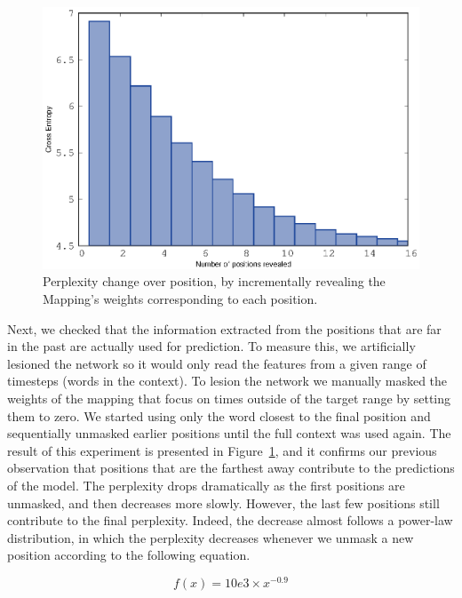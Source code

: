 \begin{figure}[t]
	\centering
	\includegraphics[width=\columnwidth]{figures/ppl_positions.eps}
	\caption{Perplexity change over position, by incrementally revealing the Mapping's weights corresponding to each position.}  
	\label{fig:position}
\end{figure}

Next, we checked that the information extracted from the positions
that are far in the past are actually used for prediction. To measure
this, we artificially lesioned the network so it would only read the
features from a given range of timesteps 
(words in the context).  To lesion the network we manually masked the
weights of the mapping that focus on times outside of the target range
by setting them to zero. We started using only the word closest to the
final position and sequentially unmasked earlier positions until the
full context was used again. The result of this experiment is
presented in Figure~\ref{fig:position}, and it confirms our previous
observation that positions that are the farthest away contribute to
the predictions of the model. The perplexity drops dramatically as the
first positions are unmasked, and then decreases more slowly. However,
the last few positions still contribute to the final
perplexity. Indeed, the decrease almost follows a power-law
distribution, in which the perplexity decreases whenever we unmask a new position according to the following equation.

\begin{equation}
f(x) = 10e3 \times x^{-0.9}
\end{equation}



